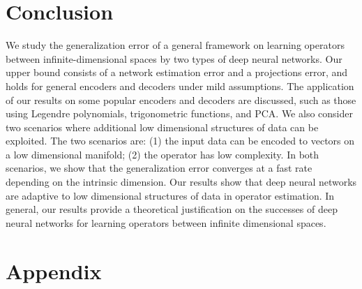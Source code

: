 \documentclass[11pt]{article} %
\begin{document}
\section{Conclusion}\label{sec.conclusion}
We study the generalization error of a general framework on learning operators between infinite-dimensional spaces by two types of deep neural networks. Our upper bound consists of a network estimation error and a projections error, and holds for general encoders and decoders under mild assumptions. The application of our results on some popular encoders and decoders are discussed, such as those using Legendre polynomials, trigonometric functions, and PCA. We also consider two scenarios where additional low dimensional structures of data can be exploited. The two scenarios are: (1) the input data can be encoded to vectors on a low dimensional manifold; (2) the operator has low complexity. In both scenarios, we show that the generalization error converges at a fast rate depending on the intrinsic dimension.
Our results show that deep neural networks are adaptive to low dimensional structures of data in operator estimation. In general, our results provide  a theoretical justification on the successes of deep neural networks for learning operators between  infinite dimensional spaces. 



\appendix
\section*{Appendix}
\end{document}
